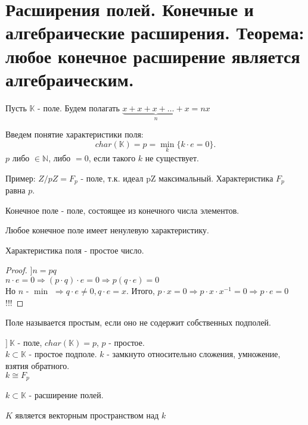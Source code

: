\section{Расширения полей. Конечные и алгебраические расширения.
Теорема: любое конечное расширение является алгебраическим.}

Пусть $\mathbb{K}$ - поле.
Будем полагать $\underbrace{x + x + x + \dots + x}_{n} = nx$

Введем понятие характеристики поля:
\[char(\mathbb{K}) = p = \underset{k}{\min}\{k \cdot e = 0\}.\]
$p$ либо $\in \mathbb{N}$, либо $= 0$, если такого $k$ не существует.

Пример: $Z/pZ = F_p$ - поле, т.к. идеал pZ максимальный. Характеристика $F_p$ равна $p$.

\begin{defn}
Конечное поле - поле, состоящее из конечного числа элементов.
\end{defn}

\begin{thm}[Свойство]
Любое конечное поле имеет ненулевую характеристику.
\end{thm}

\begin{thm}[Свойство]
Характеристика поля - простое число.
\end{thm}
\begin{proof}
$] n = pq$ \\
$n \cdot e = 0 \Rightarrow (p \cdot q) \cdot e = 0 \Rightarrow p(q \cdot e) = 0$ \\
Но $n$ - $\min$ $\Rightarrow q \cdot e \neq 0, q \cdot e = x$.
Итого, $p \cdot x = 0 \Rightarrow p \cdot x \cdot x^{-1} = 0 \Rightarrow p \cdot e = 0$!!!
\end{proof}

\begin{defn}
Поле называется простым, если оно не содержит собственных подполей.
\end{defn}

$]~\mathbb{K}$ - поле, $char(\mathbb{K}) = p$, $p$ - простое.\\
$k \subset \mathbb{K}$ - простое подполе. $k$ - замкнуто относительно сложения, умножение, взятия обратного.\\
$k \cong F_p$

\begin{defn}
$k \subset \mathbb{K}$ - расширение полей.
\end{defn}

$K$ является векторным пространством над $k$

